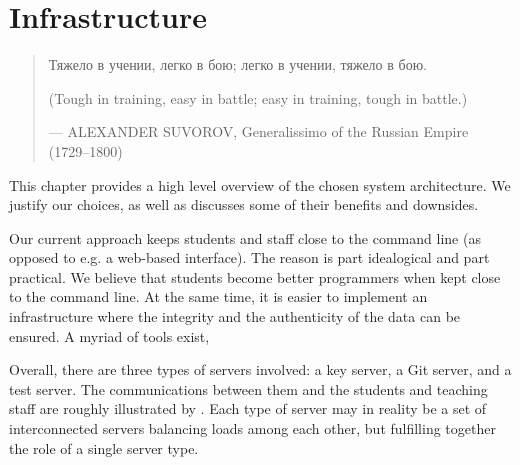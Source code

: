 
\chapter{Infrastructure}

\begin{quotation}

\footnotesize\sffamily\itshape

\begin{flushright}


Тяжело в учении, легко в бою; легко в учении, тяжело в бою.


\smallbreak

(Tough in training, easy in battle; easy in training, tough in battle.)

\smallbreak

\upshape

--- ALEXANDER SUVOROV, Generalissimo of the Russian Empire (1729--1800)

\end{flushright}

\end{quotation}

This chapter provides a high level overview of the chosen system architecture.
We justify our choices, as well as discusses some of their benefits and
downsides.

Our current approach keeps students and staff close to the command line (as
opposed to e.g. a web-based interface). The reason is part idealogical and part
practical. We believe that students become better programmers when kept close
to the command line. At the same time, it is easier to implement an
infrastructure where the integrity and the authenticity of the data can be
ensured. A myriad of tools exist,

Overall, there are three types of servers involved: a key server, a Git server,
and a test server. The communications between them and the students and
teaching staff are roughly illustrated by . Each
type of server may in reality be a set of interconnected servers balancing
loads among each other, but fulfilling together the role of a single server
type.











